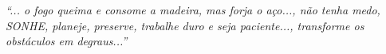 \thispagestyle{empty}

\vspace*{\fill}
\begin{flushright}
	\begin{minipage}{8cm}
		\textit{
			“... o fogo queima e consome a madeira, mas forja o aço...,
			não tenha medo, SONHE, planeje, preserve, trabalhe duro e seja paciente...,
			transforme os obstáculos em degraus...”
			\\\\
		}
	\end{minipage}
\end{flushright}


